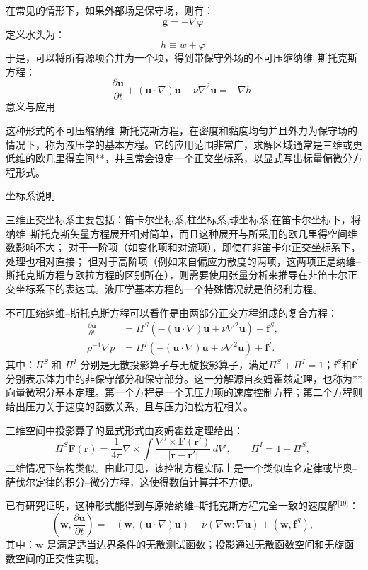 在常见的情形下，如果外部场是保守场，则有：
$$
\mathbf{g} = -\nabla \varphi~
$$
定义水头为：
$$
h \equiv w + \varphi~
$$
于是，可以将所有源项合并为一个项，得到带保守外场的不可压缩纳维–斯托克斯方程：
$$
\frac{\partial \mathbf{u}}{\partial t}
+ (\mathbf{u} \cdot \nabla)\mathbf{u}
- \nu \nabla^2 \mathbf{u}
= -\nabla h.~
$$
意义与应用

这种形式的不可压缩纳维–斯托克斯方程，在密度和黏度均匀并且外力为保守场的情况下，称为液压学的基本方程。它的应用范围非常广，求解区域通常是三维或更低维的欧几里得空间**，并且常会设定一个正交坐标系，以显式写出标量偏微分方程形式。

坐标系说明

三维正交坐标系主要包括：笛卡尔坐标系,柱坐标系,球坐标系;在笛卡尔坐标下，将纳维–斯托克斯矢量方程展开相对简单，而且这种展开与所采用的欧几里得空间维数影响不大；
对于一阶项（如变化项和对流项），即使在非笛卡尔正交坐标系下，处理也相对直接；
但对于高阶项（例如来自偏应力散度的两项，这两项正是纳维–斯托克斯方程与欧拉方程的区别所在），则需要使用张量分析来推导在非笛卡尔正交坐标系下的表达式。液压学基本方程的一个特殊情况就是伯努利方程。

不可压缩纳维–斯托克斯方程可以看作是由两部分正交方程组成的复合方程：
$$
\begin{aligned}
\frac{\partial \mathbf{u}}{\partial t}
&=\Pi^S\left(-(\mathbf{u} \cdot \nabla)\mathbf{u} + \nu \nabla^2 \mathbf{u}\right) + \mathbf{f}^S,\\
\rho^{-1} \nabla p
&=\Pi^I\left(-(\mathbf{u} \cdot \nabla)\mathbf{u} + \nu \nabla^2 \mathbf{u}\right) + \mathbf{f}^I.
\end{aligned}~
$$
其中：$\Pi^S$ 和 $\Pi^I$ 分别是无散投影算子与无旋投影算子，满足$\Pi^S + \Pi^I = 1$；$\mathbf{f}^S$和$\mathbf{f}^I$分别表示体力中的非保守部分和保守部分。这一分解源自亥姆霍兹定理，也称为**向量微积分基本定理。第一个方程是一个无压力项的速度控制方程；第二个方程则给出压力关于速度的函数关系，且与压力泊松方程相关。

三维空间中投影算子的显式形式由亥姆霍兹定理给出：
$$
\Pi^S \mathbf{F}(\mathbf{r})
= \frac{1}{4\pi}
\nabla \times
\int
\frac{\nabla' \times \mathbf{F}(\mathbf{r}')}
{|\mathbf{r} - \mathbf{r}'|}
\, dV',
\qquad
\Pi^I = 1 - \Pi^S,~
$$
二维情况下结构类似。由此可见，该控制方程实际上是一个类似库仑定律或毕奥–萨伐尔定律的积分–微分方程，这使得数值计算并不方便。

已有研究证明，这种形式能得到与原始纳维–斯托克斯方程完全一致的速度解\(^\text{[19]}\)：
$$
(\mathbf{w}, \frac{\partial \mathbf{u}}{\partial t})
= -(\mathbf{w}, (\mathbf{u} \cdot \nabla)\mathbf{u})
-\nu (\nabla \mathbf{w} : \nabla \mathbf{u})
+ (\mathbf{w}, \mathbf{f}^S),~
$$
其中：$\mathbf{w}$ 是满足适当边界条件的无散测试函数；投影通过无散函数空间和无旋函数空间的正交性实现。

